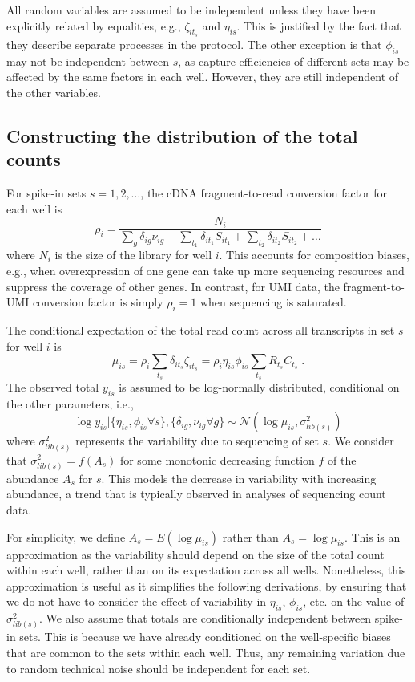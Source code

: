 \documentclass{article}
\begin{document}
All random variables are assumed to be independent unless they have been explicitly related by equalities, e.g., $\zeta_{it_s}$ and $\eta_{is}$.
This is justified by the fact that they describe separate processes in the protocol.
The other exception is that $\phi_{is}$ may not be independent between $s$, as capture efficiencies of different sets may be affected by the same factors in each well.
However, they are still independent of the other variables.

\subsection{Constructing the distribution of the total counts}
For spike-in sets $s=1, 2, \ldots$, the cDNA fragment-to-read conversion factor for each well is
\[
    \rho_i = \frac{N_i}{\sum_g \delta_{ig}\nu_{ig} + \sum_{t_1} \delta_{it_1} S_{it_1}  + \sum_{t_2} \delta_{it_2} S_{it_2} + \ldots} 
\]
where $N_i$ is the size of the library for well $i$.
This accounts for composition biases, e.g., when overexpression of one gene can take up more sequencing resources and suppress the coverage of other genes.
In contrast, for UMI data, the fragment-to-UMI conversion factor is simply $\rho_i = 1$ when sequencing is saturated.

The conditional expectation of the total read count across all transcripts in set $s$ for well $i$ is
\[
    \mu_{is} = \rho_i  \textstyle\sum_{t_s} \delta_{it_s} \zeta_{it_s} = \rho_i  \eta_{is} \phi_{is} \sum_{t_s} R_{t_s} C_{t_s} \;.
\]
The observed total $y_{is}$ is assumed to be log-normally distributed, conditional on the other parameters, i.e., 
\[
    \log y_{is} | \{ \eta_{is}, \phi_{is} \forall s \}, \{ \delta_{ig}, \nu_{ig} \forall g \} \sim \mathcal{N}(\log \mu_{is}, \sigma^2_{lib(s)})
\]
where $\sigma^2_{lib(s)}$ represents the variability due to sequencing of set $s$.
We consider that $\sigma^2_{lib(s)} = f(A_s)$ for some monotonic decreasing function $f$ of the abundance $A_s$ for $s$.
This models the decrease in variability with increasing abundance, a trend that is typically observed in analyses of sequencing count data.

For simplicity, we define $A_s = E(\log \mu_{is})$ rather than $A_s = \log \mu_{is}$.
This is an approximation as the variability should depend on the size of the total count within each well, rather than on its expectation across all wells.
Nonetheless, this approximation is useful as it simplifies the following derivations, by ensuring that we do not have to consider the effect of variability in $\eta_{is}$, $\phi_{is}$, etc. on the value of $\sigma^2_{lib(s)}$.
We also assume that totals are conditionally independent between spike-in sets.
This is because we have already conditioned on the well-specific biases that are common to the sets within each well.
Thus, any remaining variation due to random technical noise should be independent for each set.
\end{document}
